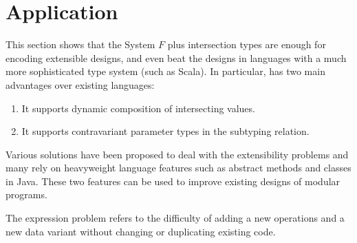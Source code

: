 \section{Application} \label{sec:application}


This section shows that the System $ F $ plus intersection types are enough for
encoding extensible designs, and even beat the designs in languages with a much
more sophisticated type system (such as Scala). In particular, \name has two
main advantages over existing languages:

\begin{enumerate}
\item It supports dynamic composition of intersecting values.
\item It supports contravariant parameter types in the subtyping relation.
\end{enumerate}

Various solutions have been proposed to deal with the extensibility problems and
many rely on heavyweight language features such as abstract methods and classes
in Java. These two features can be used to improve existing designs of modular
programs.



The expression problem refers to the difficulty of adding a new operations and a
new data variant without changing or duplicating existing code.







